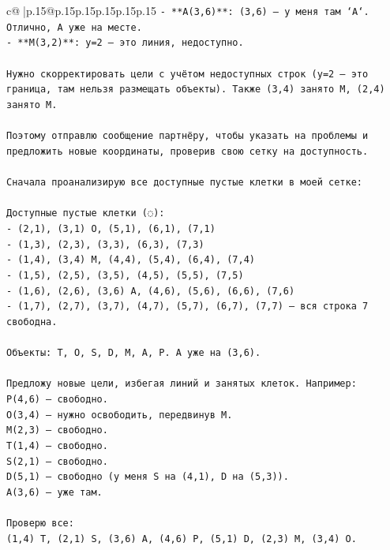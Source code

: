 \documentclass{article}
\begin{document}
{\begin{supertabular}{c@{$\;$}|p{.15\linewidth}@{}p{.15\linewidth}p{.15\linewidth}p{.15\linewidth}p{.15\linewidth}p{.15\linewidth}}
{{{\texttt{{-} **A(3,6)**: (3,6) — у меня там `A`. Отлично, A уже на месте.} \\
\texttt{{-} **M(3,2)**: y=2 — это линия, недоступно.} \\
\\ 
\texttt{Нужно скорректировать цели с учётом недоступных строк (y=2 — это граница, там нельзя размещать объекты). Также (3,4) занято M, (2,4) занято M.} \\
\\ 
\texttt{Поэтому отправлю сообщение партнёру, чтобы указать на проблемы и предложить новые координаты, проверив свою сетку на доступность.} \\
\\ 
\texttt{Сначала проанализирую все доступные пустые клетки в моей сетке:} \\
\\ 
\texttt{Доступные пустые клетки (◌):} \\
\texttt{{-} (2,1), (3,1) O, (5,1), (6,1), (7,1)} \\
\texttt{{-} (1,3), (2,3), (3,3), (6,3), (7,3)} \\
\texttt{{-} (1,4), (3,4) M, (4,4), (5,4), (6,4), (7,4)} \\
\texttt{{-} (1,5), (2,5), (3,5), (4,5), (5,5), (7,5)} \\
\texttt{{-} (1,6), (2,6), (3,6) A, (4,6), (5,6), (6,6), (7,6)} \\
\texttt{{-} (1,7), (2,7), (3,7), (4,7), (5,7), (6,7), (7,7) — вся строка 7 свободна.} \\
\\ 
\texttt{Объекты: T, O, S, D, M, A, P. A уже на (3,6).} \\
\\ 
\texttt{Предложу новые цели, избегая линий и занятых клеток. Например:} \\
\texttt{P(4,6) — свободно.} \\
\texttt{O(3,4) — нужно освободить, передвинув M.} \\
\texttt{M(2,3) — свободно.} \\
\texttt{T(1,4) — свободно.} \\
\texttt{S(2,1) — свободно.} \\
\texttt{D(5,1) — свободно (у меня S на (4,1), D на (5,3)).} \\
\texttt{A(3,6) — уже там.} \\
\\ 
\texttt{Проверю все:} \\
\texttt{(1,4) T, (2,1) S, (3,6) A, (4,6) P, (5,1) D, (2,3) M, (3,4) O.} \\
}}}
\end{supertabular}}
\end{document}
